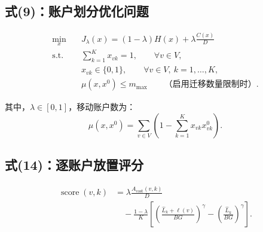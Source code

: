 \documentclass[UTF8,fontset=fandol,12pt]{ctexart}
\begin{document}
\subsection*{式(9)：账户划分优化问题}

\begin{equation}
\begin{aligned}
\min_{x}\quad
& J_{\lambda}(x)
  = (1-\lambda)H(x) + \lambda\frac{C(x)}{D}
\\[0.6em]
\text{s.t.}\quad
& \sum_{k=1}^{K} x_{vk} = 1,
  \qquad \forall v\in V,
\\[0.4em]
& x_{vk}\in\{0,1\},
  \qquad \forall v\in V,\ k=1,\ldots,K,
\\[0.4em]
& \mu(x,x^{0})\le m_{\max}
  \qquad \text{（启用迁移数量限制时）}.
\end{aligned}
\tag{9}
\label{eq:glas-account-partition}
\end{equation}

其中，$\lambda\in[0,1]$，移动账户数为：
\begin{equation*}
\mu(x,x^{0})
= \sum_{v\in V}
  \left(1-\sum_{k=1}^{K}x_{vk}x^{0}_{vk}\right).
\end{equation*}

\subsection*{式(14)：逐账户放置评分}

\begin{equation}
\begin{aligned}
\operatorname{score}(v,k)
&= \lambda\frac{A_{\mathrm{cost}}(v,k)}{D}
\\[0.6em]
&\quad -\frac{1-\lambda}{K}
\left[
  \left(\frac{\widehat{L}_{k}+\ell(v)}{BG}\right)^{\gamma}
  -\left(\frac{\widehat{L}_{k}}{BG}\right)^{\gamma}
\right].
\end{aligned}
\tag{14}
\label{eq:glas-account-placement-score}
\end{equation}
\end{document}
